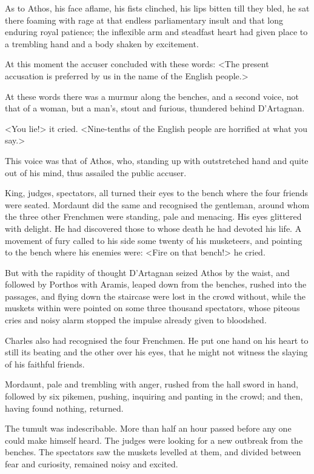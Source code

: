 As to Athos, his face aflame, his fists clinched, his lips bitten till they bled, he sat there foaming with rage at that endless parliamentary insult and that long enduring royal patience; the inflexible arm and steadfast heart had given place to a trembling hand and a body shaken by excitement.

At this moment the accuser concluded with these words: <The present accusation is preferred by us in the name of the English people.>

At these words there was a murmur along the benches, and a second voice, not that of a woman, but a man's, stout and furious, thundered behind D'Artagnan.

<You lie!> it cried. <Nine-tenths of the English people are horrified at what you say.>

This voice was that of Athos, who, standing up with outstretched hand and quite out of his mind, thus assailed the public accuser.

King, judges, spectators, all turned their eyes to the bench where the four friends were seated. Mordaunt did the same and recognised the gentleman, around whom the three other Frenchmen were standing, pale and menacing. His eyes glittered with delight. He had discovered those to whose death he had devoted his life. A movement of fury called to his side some twenty of his musketeers, and pointing to the bench where his enemies were: <Fire on that bench!> he cried.

But with the rapidity of thought D'Artagnan seized Athos by the waist, and followed by Porthos with Aramis, leaped down from the benches, rushed into the passages, and flying down the staircase were lost in the crowd without, while the muskets within were pointed on some three thousand spectators, whose piteous cries and noisy alarm stopped the impulse already given to bloodshed.

Charles also had recognised the four Frenchmen. He put one hand on his heart to still its beating and the other over his eyes, that he might not witness the slaying of his faithful friends.

Mordaunt, pale and trembling with anger, rushed from the hall sword in hand, followed by six pikemen, pushing, inquiring and panting in the crowd; and then, having found nothing, returned.

The tumult was indescribable. More than half an hour passed before any one could make himself heard. The judges were looking for a new outbreak from the benches. The spectators saw the muskets levelled at them, and divided between fear and curiosity, remained noisy and excited.

